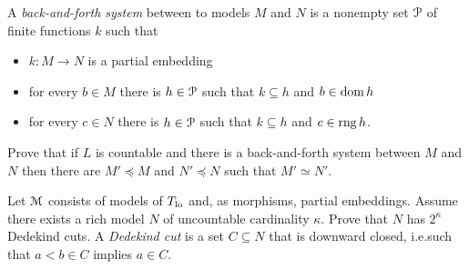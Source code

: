 

\begin{exercise}
    A \emph{back-and-forth system\/} between to models $M$ and $N$ is a nonempty set $\P$ of finite functions $k$ such that
    \begin{itemize}
        \item[0.] $k:M\to N$ is a partial embedding
        \item[1a.] for every $b\in M$ there is $h\in\P$ such that $k\subseteq h$ and $b\in\dom h$
        \item[1b.] for every $c\in N$ there is $h\in\P$ such that $k\subseteq h$ and $c\in\range h$.
    \end{itemize}
    Prove that if $L$ is countable and there is a back-and-forth system between $M$ and $N$ then there are $M'\preceq M$ and $N'\preceq N$ such that $M'\simeq N'$.
\end{exercise}

\begin{exercise}
  Let $\M$ consists of models of $T_{\rm lo}$ and, as morphisms, partial embeddings.
  Assume there exists a rich model $N$ of uncountable cardinality $\kappa$.
  Prove that $N$ has $2^\kappa$ Dedekind cuts. A \textit{Dedekind cut\/} is a set $C\subseteq N$ that is downward closed, i.e.\@ such that $a<b\in C$ implies $a\in C$.
\end{exercise}
